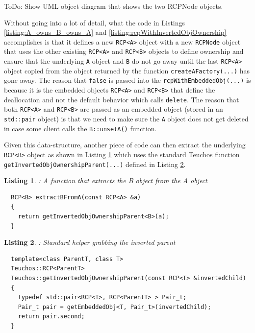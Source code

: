 \documentclass[pdf,ps2pdf,11pt]{SANDreport}
\newtheorem{listing}{Listing}
\begin{document}
ToDo: Show UML object diagram that shows the two RCPNode objects.


Without going into a lot of detail, what the code in Listings
{}\ref{listing:A_owns_B_owns_A} and
{}\ref{listing:rcpWithInvertedObjOwnership} accomplishes is that it
defines a new {}\texttt{RCP<A>} object with a new {}\texttt{RCPNode}
object that uses the other existing {}\texttt{RCP<A>} and
{}\texttt{RCP<B>} objects to define ownership and ensure that the
underlying {}\texttt{A} object and {}\texttt{B} do not go away until
the last {}\texttt{RCP<A>} object copied from the object returned by
the function {}\texttt{createAFactory(...)} has gone away.  The reason
that {}\texttt{false} is passed into the
{}\texttt{rcpWithEmbeddedObj(...)} is because it is the embedded
objects {}\texttt{RCP<A>} and {}\texttt{RCP<B>} that define the
deallocation and not the default behavior which calls
{}\texttt{delete}.  The reason that both {}\texttt{RCP<A>} and
{}\texttt{RCP<B>} are passed as an embedded object (stored in an
{}\texttt{std::pair} object) is that we need to make sure the
{}\texttt{A} object does not get deleted in case some client calls the
{}\texttt{B::unsetA()} function.

Given this data-structure, another piece of code can then extract the
underlying {}\texttt{RCP<B>} object as shown in Listing
{}\ref{listing:Extract_B_from_A} which uses the standard Teuchos
function {}\texttt{getInvertedObjOwnershipParent(...)} defined in
Listing {}\ref{listing:getInvertedObjOwnershipParent}.

\begin{listing}: A function that extracts the B object from the A object \\
\label{listing:Extract_B_from_A}
{\small\begin{verbatim}
  RCP<B> extractBFromA(const RCP<A> &a)
  {
    return getInvertedObjOwnershipParent<B>(a);
  }
\end{verbatim}}
\end{listing}


\begin{listing}: Standard helper grabbing the inverted parent \\
\label{listing:getInvertedObjOwnershipParent}
{\small\begin{verbatim}
  template<class ParentT, class T>
  Teuchos::RCP<ParentT>
  Teuchos::getInvertedObjOwnershipParent(const RCP<T> &invertedChild)
  {
    typedef std::pair<RCP<T>, RCP<ParentT> > Pair_t;
    Pair_t pair = getEmbeddedObj<T, Pair_t>(invertedChild);
    return pair.second;
  }
\end{verbatim}}
\end{listing}
\end{document}
